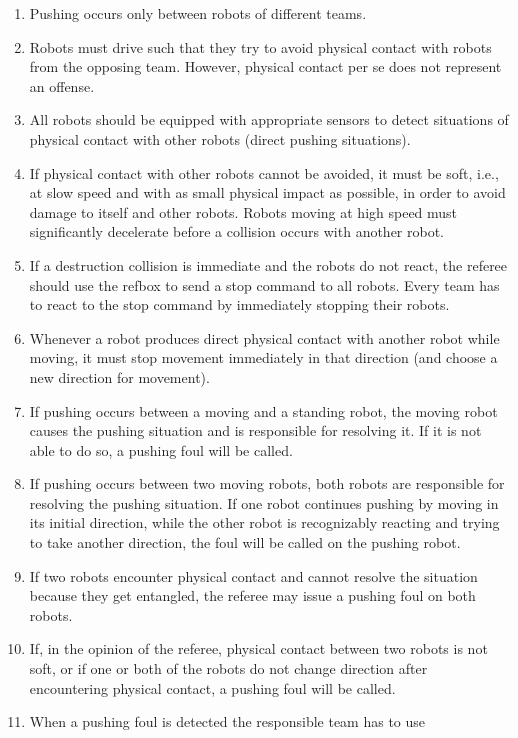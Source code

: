 \documentclass[12pt,twoside]{article}
\begin{document}
\begin{enumerate}
\item Pushing occurs only between robots of different teams.
\item Robots must drive such that they try to avoid physical contact
  with robots from the opposing team. However, physical contact per se
  does not represent an offense.
\item All robots should be equipped with appropriate sensors to detect
  situations of physical contact with other robots (direct pushing
  situations).
\item If physical contact with other robots cannot be avoided, it must
  be soft, i.e., at slow speed and with as small physical impact as
  possible, in order to avoid damage to itself and other
  robots. Robots moving at high speed must significantly decelerate
  before a collision occurs with another robot.
\item If a destruction collision is immediate and the robots do not
  react, the referee should use the refbox to send a stop command to
  all robots. Every team has to react to the stop command by
  immediately stopping their robots.
\item Whenever a robot produces direct physical contact with another
  robot while moving, it must stop movement immediately in that
  direction (and choose a new direction for movement).
\item If pushing occurs between a moving and a standing robot, the
  moving robot causes the pushing situation and is responsible for
  resolving it. If it is not able to do so, a pushing foul will be
  called.
\item If pushing occurs between two moving robots, both robots are
  responsible for resolving the pushing situation. If one robot
  continues pushing by moving in its initial direction, while the
  other robot is recognizably reacting and trying to take another
  direction, the foul will be called on the pushing robot.
\item If two robots encounter physical contact and cannot resolve the
  situation because they get entangled, the referee may issue a
  pushing foul on both robots.
\item If, in the opinion of the referee, physical contact between two
  robots is not soft, or if one or both of the robots do not change
  direction after encountering physical contact, a pushing foul will
  be called.
\item When a pushing foul is detected the responsible team has to use

\end{enumerate}
\end{document}
